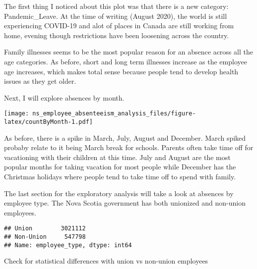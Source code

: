 \documentclass[
]{article}
\begin{document}
The first thing I noticed about this plot was that there is a new
category: Pandemic\_Leave. At the time of writing (August 2020), the
world is still experiencing COVID-19 and alot of places in Canada are
still working from home, evening though restrictions have been loosening
across the country.

Family illnesses seems to be the most popular reason for an absence
across all the age categories. As before, short and long term illnesses
increase as the employee age increases, which makes total sense because
people tend to develop health issues as they get older.

Next, I will explore absences by month.

\texttt{[image: ns\_employee\_absenteeism\_analysis\_files/figure-latex/countByMonth-1.pdf]}

As before, there is a spike in March, July, August and December. March
spiked probaby relate to it being March break for schools. Parents often
take time off for vacationing with their children at this time. July and
August are the most popular months for taking vacation for most people
while December has the Christmas holidays where people tend to take time
off to spend with family.

The last section for the exploratory analysis will take a look at
absences by employee type. The Nova Scotia government has both unionized
and non-union employees.

\begin{verbatim}
## Union        3021112
## Non-Union     547798
## Name: employee_type, dtype: int64
\end{verbatim}

Check for statistical differences with union vs non-union employees
\end{document}
